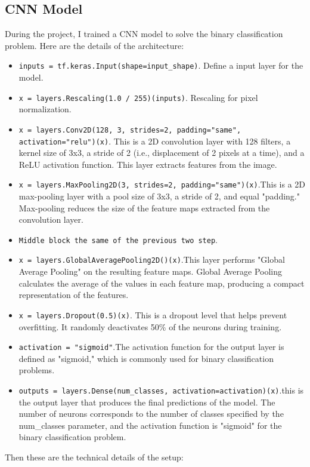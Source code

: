 \subsection{CNN Model}
During the project, I trained a CNN model to solve the binary classification problem. Here are the details of the architecture:
\begin{itemize}
\item \texttt{inputs = tf.keras.Input(shape=input\_shape)}. Define a input layer for the model. 
\item \texttt{x = layers.Rescaling(1.0 / 255)(inputs)}. Rescaling for pixel normalization.
\item \texttt{x = layers.Conv2D(128, 3, strides=2, padding="same", activation="relu")(x)}. This is a 2D convolution layer with 128 filters, a kernel size of 3x3, a stride of 2 (i.e., displacement of 2 pixels at a time), and a ReLU activation function. This layer extracts features from the image.
\item \texttt{x = layers.MaxPooling2D(3, strides=2, padding="same")(x)}.This is a 2D max-pooling layer with a pool size of 3x3, a stride of 2, and equal "padding." Max-pooling reduces the size of the feature maps extracted from the convolution layer.
\item \texttt{Middle block the same of the previous two step}.
\item \texttt{x = layers.GlobalAveragePooling2D()(x)}.This layer performs "Global Average Pooling" on the resulting feature maps. Global Average Pooling calculates the average of the values in each feature map, producing a compact representation of the features.
\item \texttt{x = layers.Dropout(0.5)(x)}. This is a dropout level that helps prevent overfitting. It randomly deactivates 50\% of the neurons during training.
\item \texttt{activation = "sigmoid"}.The activation function for the output layer is defined as "sigmoid," which is commonly used for binary classification problems.
\item \texttt{outputs = layers.Dense(num\_classes, activation=activation)(x)}.this is the output layer that produces the final predictions of the model. The number of neurons corresponds to the number of classes specified by the num\_classes parameter, and the activation function is "sigmoid" for the binary classification problem.
\end{itemize}
Then these are the technical details of the setup:
